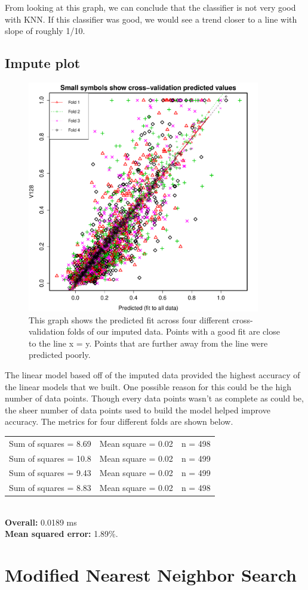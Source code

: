 \documentclass{article}
\begin{document}
From looking at this graph, we can conclude that the classifier is not very
good with KNN. If this classifier was good, we would see a trend closer to a line
with slope of roughly 1/10.

\subsection{Impute plot}
\begin{figure}[H]
\centering
\includegraphics[width=4in]{impute.pdf}
\caption{This graph shows the predicted fit across four different
cross-validation folds of our imputed data. Points with a good fit are close to
the line x = y. Points that are further away from the line were predicted
poorly.}
\end{figure}

The linear model based off of the imputed data provided the highest accuracy of
the linear models that we built. One possible reason for this could be the high
number of data points. Though every data points wasn't as complete as could be,
the sheer number of data points used to build the model helped improve accuracy.
The metrics for four different folds are shown below.\\

\noindent
\begin{tabular}{l c r}
  Sum of squares = 8.69 & Mean square = 0.02 & n = 498\\ 
  Sum of squares = 10.8 & Mean square = 0.02 & n = 499\\ 
  Sum of squares = 9.43 & Mean square = 0.02 & n = 499\\ 
  Sum of squares = 8.83 & Mean square = 0.02 & n = 498\\ 
\end{tabular}\\

\noindent
\textbf{Overall:} 0.0189 ms \\
\textbf{Mean squared error:} 1.89\%.

\section{Modified Nearest Neighbor Search}
\end{document}
